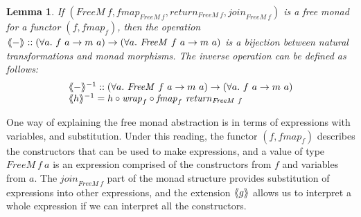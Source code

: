 \documentclass{jfp1}
\newcommand{\fmext}[1]{\langle\kern-0.25em\langle #1 \rangle\kern-0.25em\rangle}
\newtheorem{lemma}{Lemma}
\begin{document}
\begin{lemma}
  If $(\mathit{FreeM}~f, \mathit{fmap}_{\mathit{FreeM}~f},
  \mathit{return}_{\mathit{FreeM}~f},
  \mathit{join}_{\mathit{FreeM}~f})$ is a free monad for a functor
  $(f, \mathit{fmap}_f)$, then the operation $\fmext{-} :: (\forall
  a.~f~a \to m~a) \to (\forall a.~\mathit{FreeM}~f~a \to m~a)$ is a
  bijection between natural transformations and monad morphisms. The
  inverse operation can be defined as follows:
  \begin{displaymath}
    \begin{array}{l}
      \fmext{-}^{-1} :: (\forall a.~\mathit{FreeM}~f~a \to m~a) \to (\forall a.~f~a \to m~a) \\
      \fmext{h}^{-1} = h \circ \mathit{wrap}_f \circ \mathit{fmap}_f~\mathit{return}_{\mathit{FreeM}~f}
    \end{array}
  \end{displaymath}
\end{lemma}

One way of explaining the free monad abstraction is in terms of
expressions with variables, and substitution. Under this reading, the
functor $(f,\mathit{fmap}_f)$ describes the constructors that can be
used to make expressions, and a value of type $\mathit{FreeM}~f~a$ is
an expression comprised of the constructors from $f$ and variables
from $a$. The $\mathit{join}_{\mathit{FreeM}~f}$ part of the monad
structure provides substitution of expressions into other expressions,
and the extension $\fmext{g}$ allows us to interpret a whole
expression if we can interpret all the constructors.
\end{document}
